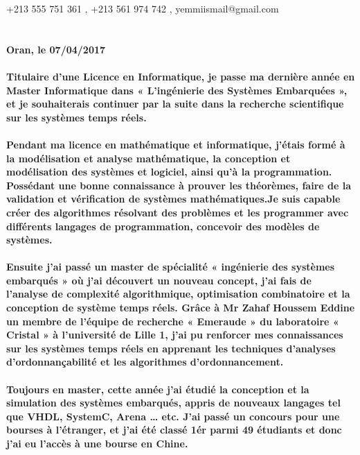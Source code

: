 \documentclass[14pt]{motivation}
\begin{document}
\pagestyle{empty}

{\faMobile \hspace{\FAspace} +213 555 751 361 \sep \faMobile \hspace{\FAspace} +213 561 974 742 \sep \faEnvelope \hspace{\FAspace} yemmiismail@gmail.com }


\section*{}
\large
\textbf{Oran, le 07/04/2017} 
\paragraph{}
\large
\textbf{
Titulaire d'une Licence en Informatique, je passe ma dernière année en Master Informatique dans « L’ingénierie des Systèmes Embarquées », et je souhaiterais continuer par la suite dans la recherche scientifique sur les systèmes temps réels.  
}
\paragraph{} 
\textbf{
Pendant ma licence en mathématique et informatique, j’étais formé à la modélisation et analyse mathématique, la conception et modélisation des systèmes et logiciel, ainsi qu’à la programmation. Possédant une bonne connaissance à prouver les théorèmes, faire de la validation et vérification de systèmes mathématiques.Je suis capable créer des algorithmes résolvant des problèmes et les programmer avec différents langages de programmation, concevoir des modèles de systèmes. 
}
\paragraph{} 
\textbf{
Ensuite j'ai passé un master de spécialité « ingénierie des systèmes embarqués » où j’ai découvert un nouveau concept, j’ai fais de l’analyse de complexité algorithmique, optimisation combinatoire et la conception de système temps réels.
Grâce à Mr Zahaf Houssem Eddine un membre de l’équipe de recherche  « Emeraude » du laboratoire « Cristal » à l’université de Lille 1, j'ai pu renforcer mes connaissances sur les systèmes temps réels en apprenant les techniques d’analyses d’ordonnançabilité et les algorithmes d’ordonnancement. 
}
\paragraph{} 
\textbf{
Toujours en master, cette année j’ai étudié la conception et la simulation des systèmes embarqués, appris de nouveaux langages tel que VHDL, SystemC, Arena … etc. 
J’ai passé un concours pour une bourses à l’étranger, et j'ai été classé 1ér parmi 49 étudiants et donc j’ai eu l’accès à une bourse en Chine.
}
\end{document}
